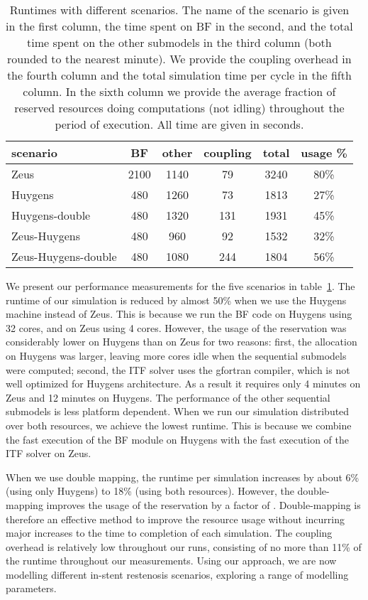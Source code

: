 \documentclass[a4,10pt]{article}
\begin{document}
\begin{table}
    \centering
\begin{tabular}{lccccc}
scenario & BF & other & coupling & total & usage \%\\
\hline
Zeus                & 2100 & 1140 & 79  & 3240 & 80\% \\
Huygens             & 480  & 1260 & 73  & 1813 & 27\% \\
Huygens-double      & 480  & 1320 & 131 & 1931 & 45\% \\
Zeus-Huygens        & 480  & 960  & 92  & 1532 & 32\% \\
Zeus-Huygens-double & 480  & 1080 & 244 & 1804 & 56\% \\
\end{tabular}

    \caption{Runtimes with different scenarios. The name of the scenario is
given in the first column, the time spent on BF in the second, and the total
time spent on the other submodels in the third column (both rounded to the
nearest minute). We provide the coupling overhead in the fourth column and the
total simulation time per cycle in the fifth column. In the sixth column we
provide the average fraction of reserved resources doing computations (not idling)
throughout the period of execution. All time are given in seconds.}\label{table:isrruntime}

\end{table}

We present our performance measurements for the five scenarios in
table~\ref{table:isrruntime}. The runtime of our simulation is reduced by almost
50\% when we use the Huygens machine instead of Zeus. This is because we run the
BF code on Huygens using 32 cores, and on Zeus using 4 cores. However, the
usage of the reservation was considerably lower on Huygens than on Zeus for two
reasons: first, the allocation on Huygens was larger, leaving more cores idle
when the sequential submodels were computed; second, the ITF solver uses the
gfortran compiler, which is not well optimized for Huygens architecture. As a
result it requires only 4 minutes on Zeus and 12 minutes on Huygens. The
performance of the other sequential submodels is less platform dependent. When
we run our simulation distributed over both resources, we achieve the lowest
runtime. This is because we combine the fast execution of the BF module on
Huygens with the fast execution of the ITF solver on Zeus.  

When we use double mapping, the runtime per simulation increases by about 6\%
(using only Huygens) to 18\% (using both resources). However, the
double-mapping improves the usage of the reservation by a factor of .
Double-mapping is therefore an effective method to improve the resource usage
without incurring major increases to the time to completion of each simulation.
The coupling overhead is relatively low throughout our runs, consisting
of no more than 11\% of the runtime throughout our measurements. Using our 
approach, we are now modelling different in-stent restenosis scenarios, 
exploring a range of modelling parameters. 
\end{document}
